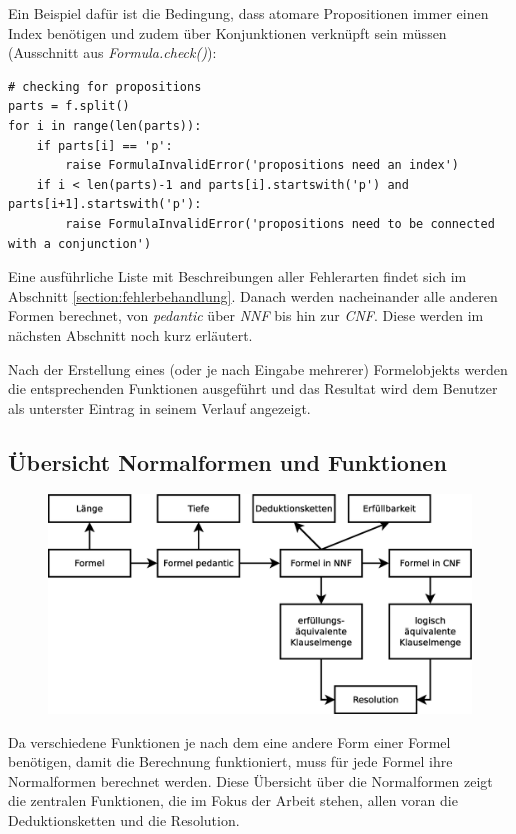 \documentclass[11pt,a4paper,ngerman]{scrreprt}
\begin{document}
Ein Beispiel dafür ist die Bedingung, dass atomare Propositionen immer einen Index benötigen und zudem über Konjunktionen verknüpft sein müssen (Ausschnitt aus \textit{Formula.check()}):
\begin{lstlisting}
# checking for propositions
parts = f.split()
for i in range(len(parts)):
    if parts[i] == 'p':
        raise FormulaInvalidError('propositions need an index')
    if i < len(parts)-1 and parts[i].startswith('p') and parts[i+1].startswith('p'):
        raise FormulaInvalidError('propositions need to be connected with a conjunction')
\end{lstlisting}
Eine ausführliche Liste mit Beschreibungen aller Fehlerarten findet sich im Abschnitt \ref{section:fehlerbehandlung}. Danach werden nacheinander alle anderen Formen berechnet, von \textit{pedantic} über \textit{NNF} bis hin zur \textit{CNF}. Diese werden im nächsten Abschnitt noch kurz erläutert.

Nach der Erstellung eines (oder je nach Eingabe mehrerer) Formelobjekts werden die entsprechenden Funktionen ausgeführt und das Resultat wird dem Benutzer als unterster Eintrag in seinem Verlauf angezeigt.

\subsection{Übersicht Normalformen und Funktionen}
\begin{figure}[ht]
\centering
\includegraphics[width=.9\linewidth]{pics/Normalformen.eps}
\end{figure}

Da verschiedene Funktionen je nach dem eine andere Form einer Formel benötigen, damit die Berechnung funktioniert, muss für jede Formel ihre Normalformen berechnet werden. Diese Übersicht über die Normalformen zeigt die zentralen Funktionen, die im Fokus der Arbeit stehen, allen voran die Deduktionsketten und die Resolution.
\end{document}
